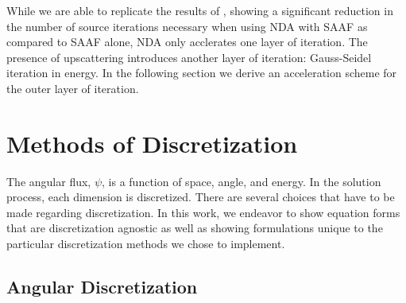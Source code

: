 While we are able to replicate the results of \cite{Wang2013}, showing a significant reduction in the number of source iterations necessary when using NDA with SAAF as compared to SAAF alone, NDA only acclerates one layer of iteration. The presence of upscattering introduces another layer of iteration: Gauss-Seidel iteration in energy. In the following section we derive an acceleration scheme for the outer layer of iteration.


\section{Methods of Discretization}
The angular flux, $\psi$, is a function of space, angle, and energy. In the solution process, each dimension is discretized. There are several choices that have to be made regarding discretization. In this work, we endeavor to show equation forms that are discretization agnostic as well as showing formulations unique to the particular discretization methods we chose to implement. 

\subsection{Angular Discretization}


